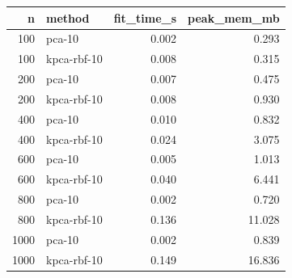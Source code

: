 \begin{tabular}{rlrr}
\toprule
n & method & fit_time_s & peak_mem_mb \\
\midrule
100 & pca-10 & 0.002 & 0.293 \\
100 & kpca-rbf-10 & 0.008 & 0.315 \\
200 & pca-10 & 0.007 & 0.475 \\
200 & kpca-rbf-10 & 0.008 & 0.930 \\
400 & pca-10 & 0.010 & 0.832 \\
400 & kpca-rbf-10 & 0.024 & 3.075 \\
600 & pca-10 & 0.005 & 1.013 \\
600 & kpca-rbf-10 & 0.040 & 6.441 \\
800 & pca-10 & 0.002 & 0.720 \\
800 & kpca-rbf-10 & 0.136 & 11.028 \\
1000 & pca-10 & 0.002 & 0.839 \\
1000 & kpca-rbf-10 & 0.149 & 16.836 \\
\bottomrule
\end{tabular}

